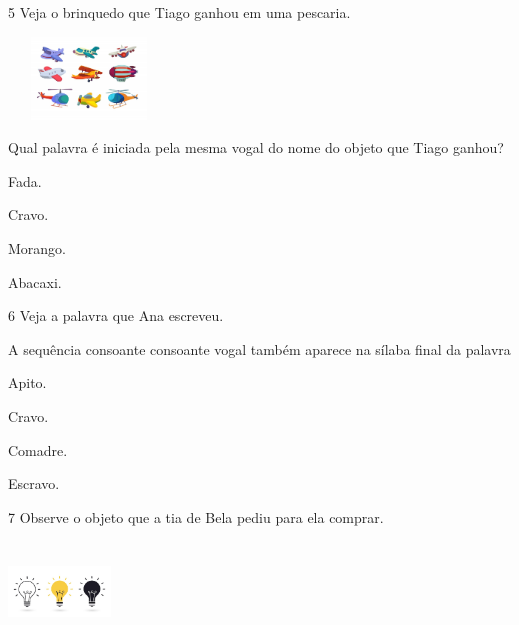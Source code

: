 \num{5} Veja o brinquedo que Tiago ganhou em uma pescaria.

\includegraphics[width=1.69097in,height=0.86538in]{media/image177.jpeg}


Qual palavra é iniciada pela mesma vogal do nome do objeto que Tiago ganhou?

\begin{escolha}
\item Fada.

\item Cravo.

\item Morango.

\item Abacaxi.
\end{escolha}

\num{6} Veja a palavra que Ana escreveu.


A sequência consoante consoante vogal também aparece na sílaba final da palavra

\begin{escolha}
\item Apito.

\item Cravo.

\item Comadre.

\item Escravo.
\end{escolha}

\num{7} Observe o objeto que a tia de Bela pediu para ela comprar.

\includegraphics[width=1.07025in,height=1.04487in]{media/image178.jpeg}


